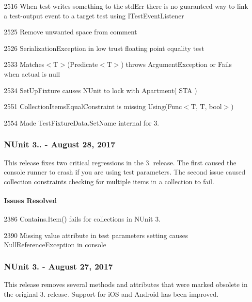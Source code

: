 \begin{DoxyItemize}
\item 2516 When test writes something to the std\+Err there is no guaranteed way to link a test-\/output event to a target test using I\+Test\+Event\+Listener
\item 2525 Remove unwanted space from comment
\item 2526 Serialization\+Exception in low trust floating point equality test
\item 2533 Matches$<$\+T$>$(\+Predicate$<$\+T$>$) throws Argument\+Exception or Fails when actual is null
\item 2534 Set\+Up\+Fixture causes N\+Unit to lock with Apartment( S\+T\+A )
\item 2551 Collection\+Items\+Equal\+Constraint is missing Using(\+Func$<$\+T, T, bool$>$)
\item 2554 Made Test\+Fixture\+Data.\+Set\+Name internal for 3.
\end{DoxyItemize}

\subsubsection*{N\+Unit 3.. -\/ August 28, 2017}

This release fixes two critical regressions in the 3. release. The first caused the console runner to crash if you are using test parameters. The second issue caused collection constraints checking for multiple items in a collection to fail.

\paragraph*{Issues Resolved}


\begin{DoxyItemize}
\item 2386 Contains.\+Item() fails for collections in N\+Unit 3.
\item 2390 Missing value attribute in test parameters setting causes Null\+Reference\+Exception in console
\end{DoxyItemize}

\subsubsection*{N\+Unit 3. -\/ August 27, 2017}

This release removes several methods and attributes that were marked obsolete in the original 3. release. Support for i\+OS and Android has been improved.

